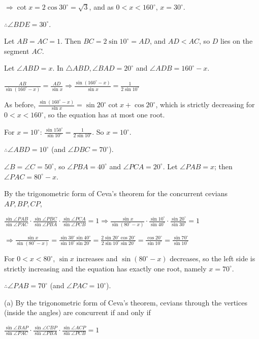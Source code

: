   $\Rightarrow \cot x = 2\cos30^\circ = \sqrt{3}$, and as $0 < x < 160^\circ$, $x = 30^\circ$.

  $\therefore \angle BDE = 30^\circ$.
\item Let $AB = AC = 1$. Then $BC = 2\sin10^\circ = AD$, and $AD < AC$, so $D$ lies on the segment $AC$.

  Let $\angle ABD = x$. In $\triangle ABD, \angle BAD = 20^\circ$ and $\angle ADB = 160^\circ - x$.

  $\frac{AB}{\sin(160^\circ - x)} = \frac{AD}{\sin x}\Rightarrow \frac{\sin(160^\circ - x)}{\sin x} =
  \frac{1}{2\sin10^\circ}$

  As before, $\frac{\sin(160^\circ - x)}{\sin x} = \sin20^\circ\cot x + \cos20^\circ$, which is strictly
  decreasing for $0 < x < 160^\circ$, so the equation has at most one root.

  For $x = 10^\circ$: $\frac{\sin150^\circ}{\sin10^\circ} = \frac{1}{2\sin10^\circ}$. So $x = 10^\circ$.

  $\therefore \angle ABD = 10^\circ$ (and $\angle DBC = 70^\circ$).
\item $\angle B = \angle C = 50^\circ$, so $\angle PBA = 40^\circ$ and $\angle PCA = 20^\circ$. Let $\angle PAB =
  x$; then $\angle PAC = 80^\circ - x$.

  By the trigonometric form of Ceva's theorem for the concurrent cevians $AP, BP, CP$,

  $\frac{\sin\angle PAB}{\sin\angle PAC}\cdot\frac{\sin\angle PBC}{\sin\angle PBA}\cdot\frac{\sin\angle
  PCA}{\sin\angle PCB} = 1\Rightarrow \frac{\sin x}{\sin(80^\circ - x)}\cdot\frac{\sin10^\circ}{\sin40^\circ}
  \cdot\frac{\sin20^\circ}{\sin30^\circ} = 1$

  $\Rightarrow \frac{\sin x}{\sin(80^\circ - x)} = \frac{\sin30^\circ\sin40^\circ}{\sin10^\circ\sin20^\circ} =
  \frac{2\sin20^\circ\cos20^\circ}{2\sin10^\circ\sin20^\circ} = \frac{\cos20^\circ}{\sin10^\circ} =
  \frac{\sin70^\circ}{\sin10^\circ}$

  For $0 < x < 80^\circ$, $\sin x$ increases and $\sin(80^\circ - x)$ decreases, so the left side is strictly
  increasing and the equation has exactly one root, namely $x = 70^\circ$.

  $\therefore \angle PAB = 70^\circ$ (and $\angle PAC = 10^\circ$).
\item (a) By the trigonometric form of Ceva's theorem, cevians through the vertices (inside the angles) are
  concurrent if and only if

  $\frac{\sin\angle BAP}{\sin\angle PAC}\cdot\frac{\sin\angle CBP}{\sin\angle PBA}\cdot\frac{\sin\angle
  ACP}{\sin\angle PCB} = 1$

